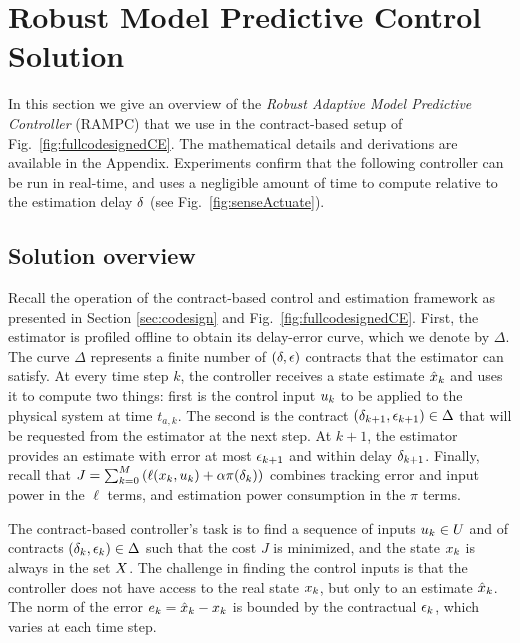 \section{Robust Model Predictive Control Solution}
\label{robustMPC}

In this section we give an overview of the \emph{Robust Adaptive Model Predictive Controller} (RAMPC) that we use in the contract-based setup of Fig.~\ref{fig:fullcodesignedCE}.
The mathematical details and derivations are available in the Appendix.
Experiments confirm that the following controller can be run in real-time, and uses a negligible amount of time to compute relative to the estimation delay $\delta$ (see Fig.~\ref{fig:senseActuate}).

\subsection{Solution overview}
Recall the operation of the contract-based control and estimation framework as presented in Section \ref{sec:codesign} and Fig.~\ref{fig:fullcodesignedCE}.
First, the estimator is profiled offline to obtain its delay-error curve, which we denote by $\Delta$.
The curve $\Delta$ represents a finite number of $(\delta,\epsilon)$ contracts that the estimator can satisfy.
At every time step $k$, the controller receives a state estimate $\hat{x}_k$ and uses it to compute two things:
first is the control input $u_{k}$ to be applied to the physical system at time $t_{a,k}$.
The second is the contract $(\delta_{k+1}, \epsilon_{k+1}) \in \Delta$ that will be requested from the estimator at the next step.
At $k+1$, the estimator provides an estimate with error at most $\epsilon_{k+1}$ and within delay $\delta_{k+1}$.
Finally, recall that $J = \sum_{k=0}^{M}\left(\ell(x_k,u_k)+ \alpha \pi(\delta_k)\right)$ 
combines tracking error and input power in the $\ell$ terms, and estimation power consumption in the $\pi$ terms.

The contract-based controller's task is to find a sequence of inputs $u_k \in U$ and of contracts $(\delta_k, \epsilon_k) \in \Delta$ such that the cost $J$ is minimized, and the state $x_k$ is always in the set $X$.
The challenge in finding the control inputs is that the controller does not have access to the real state $x_k$, but only to an estimate $\hat{x}_k$.
The norm of the error $e_k = \hat{x}_k - x_k$ is bounded by the contractual $\epsilon_k$, which varies at each time step.

